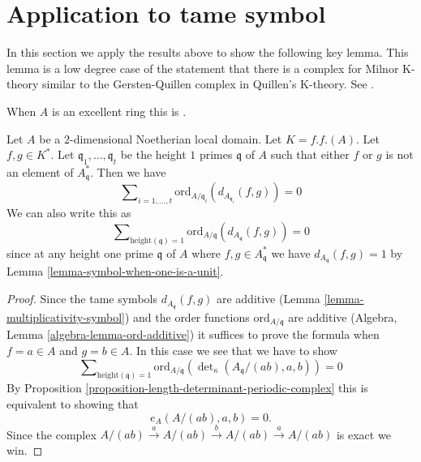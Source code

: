 \section{Application to tame symbol}
\label{section-application-tame-symbol}

\noindent
In this section we apply the results above to show the following key lemma.
This lemma is a low degree case of the statement that there is a complex
for Milnor K-theory similar to the Gersten-Quillen complex in Quillen's
K-theory. See \cite{Kato-Milnor-K}.

\begin{lemma}
\label{lemma-secondary-ramification}
\begin{reference}
When $A$ is an excellent ring this is \cite[Proposition 1]{Kato-Milnor-K}.
\end{reference}
Let $A$ be a $2$-dimensional Noetherian local domain.
Let $K = f.f.(A)$. Let $f, g \in K^*$.
Let $\mathfrak q_1, \ldots, \mathfrak q_t$ be the height
$1$ primes $\mathfrak q$ of $A$ such that either $f$ or $g$ is not an
element of $A^*_{\mathfrak q}$.
Then we have
$$
\sum\nolimits_{i = 1, \ldots, t}
\text{ord}_{A/\mathfrak q_i}(d_{A_{\mathfrak q_i}}(f, g))
=
0
$$
We can also write this as
$$
\sum\nolimits_{\text{height}(\mathfrak q) = 1}
\text{ord}_{A/\mathfrak q}(d_{A_{\mathfrak q}}(f, g))
=
0
$$
since at any height one prime $\mathfrak q$
of $A$ where $f, g \in A^*_{\mathfrak q}$
we have $d_{A_{\mathfrak q}}(f, g) = 1$ by
Lemma \ref{lemma-symbol-when-one-is-a-unit}.
\end{lemma}

\begin{proof}
Since the tame symbols $d_{A_{\mathfrak q}}(f, g)$ are additive
(Lemma \ref{lemma-multiplicativity-symbol}) and the order
functions $\text{ord}_{A/\mathfrak q}$
are additive (Algebra, Lemma \ref{algebra-lemma-ord-additive})
it suffices to prove the formula when $f = a \in A$ and
$g = b \in A$. In this case we see that we have to show
$$
\sum\nolimits_{\text{height}(\mathfrak q) = 1}
\text{ord}_{A/\mathfrak q}(\det\nolimits_\kappa(A_{\mathfrak q}/(ab), a, b))
= 0
$$
By Proposition \ref{proposition-length-determinant-periodic-complex}
this is equivalent to showing that
$$
e_A(A/(ab), a, b) = 0.
$$
Since the complex
$A/(ab) \xrightarrow{a} A/(ab) \xrightarrow{b} A/(ab) \xrightarrow{a} A/(ab)$
is exact we win.
\end{proof}






















